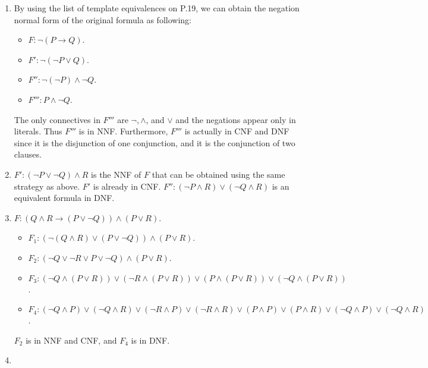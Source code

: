 \begin{exer}[1.5]
    $ $
    \begin{enumerate}[label=(\alph*)]
        \item
            By using the list of template equivalences on P.19, we can obtain the negation normal form of the original formula as following:
            \begin{itemize}
                \item
                    $F: \neg (P \rightarrow Q)$.
                \item
                    $F': \neg (\neg P \lor Q)$.
                \item
                    $F'': \neg (\neg P) \land \neg Q$.
                \item
                    $F''': P \land \neg Q$.
            \end{itemize}
            The only connectives in $F'''$ are $\neg, \land$, and $\lor$ and the negations appear only in literals.
            Thus $F'''$ is in NNF.
            Furthermore, $F'''$ is actually in CNF and DNF since it is the disjunction of one conjunction, and it is the conjunction of two clauses.
        \item
            $F': (\neg P \lor \neg Q) \land R$ is the NNF of $F$ that can be obtained using the same strategy as above.
            $F'$ is already in CNF.
            $F'': (\neg P \land R) \lor (\neg Q \land R)$ is an equivalent formula in DNF.
        \item
            $F:(Q \land R \rightarrow (P \lor \neg Q)) \land (P \lor R)$.
            \begin{itemize}
                \item
                    $F_1: (\neg (Q \land R) \lor (P \lor \neg Q)) \land (P \lor R)$.
                \item
                    $F_2: (\neg Q \lor \neg R \lor P \lor \neg Q) \land (P \lor R)$.
                \item
                    $F_3: (\neg Q \land (P \lor R)) \lor (\neg R \land (P \lor R)) \lor (P \land (P \lor R)) \lor (\neg Q \land (P \lor R))$.
                \item
                    $F_4: (\neg Q \land P) \lor (\neg Q \land R) \lor (\neg R \land P) \lor (\neg R \land R) \lor (P \land P) \lor (P \land R) \lor (\neg Q \land P) \lor (\neg Q \land R)$.
            \end{itemize}
            $F_2$ is in NNF and CNF, and $F_4$ is in DNF.
        \item

\end{enumerate}
\end{exer}
